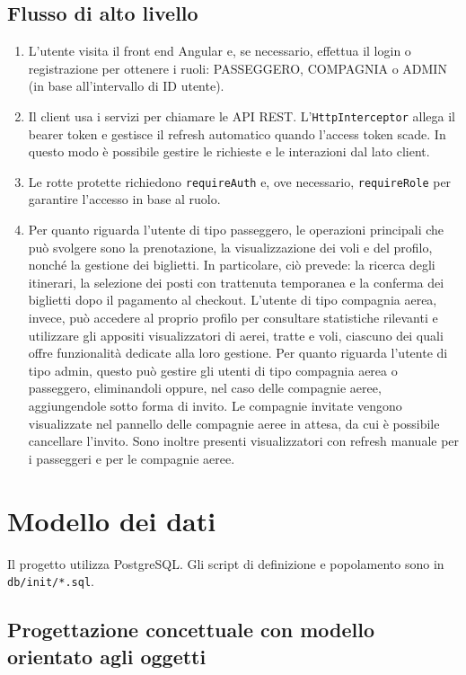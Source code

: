 \documentclass[12pt,a4paper]{article}
\begin{document}
\subsection{Flusso di alto livello}
\begin{enumerate}[noitemsep]
	\item L'utente visita il front end Angular e, se necessario, effettua il login o registrazione per ottenere i ruoli: PASSEGGERO, COMPAGNIA o ADMIN (in base all'intervallo di ID utente).
	\item Il client usa i servizi per chiamare le API REST. L'\texttt{HttpInterceptor} allega il bearer token e gestisce il refresh automatico quando l'access token scade. In questo modo è possibile gestire le richieste e le interazioni dal lato client.
	\item Le rotte protette richiedono \texttt{requireAuth} e, ove necessario, \texttt{requireRole} per garantire l'accesso in base al ruolo.
	\item Per quanto riguarda l'utente di tipo passeggero, le operazioni principali che può svolgere sono la prenotazione, la visualizzazione dei voli e del profilo, nonché la gestione dei biglietti. In particolare, ciò prevede: la ricerca degli itinerari, la selezione dei posti con trattenuta temporanea e la conferma dei biglietti dopo il pagamento al checkout. L'utente di tipo compagnia aerea, invece, può accedere al proprio profilo per consultare statistiche rilevanti e utilizzare gli appositi visualizzatori di aerei, tratte e voli, ciascuno dei quali offre funzionalità dedicate alla loro gestione. Per quanto riguarda l'utente di tipo admin, questo può gestire gli utenti di tipo compagnia aerea o passeggero, eliminandoli oppure, nel caso delle compagnie aeree, aggiungendole sotto forma di invito. Le compagnie invitate vengono visualizzate nel pannello delle compagnie aeree in attesa, da cui è possibile cancellare l'invito. Sono inoltre presenti visualizzatori con refresh manuale per i passeggeri e per le compagnie aeree.
\end{enumerate}

\newpage

\section{Modello dei dati}
Il progetto utilizza PostgreSQL. Gli script di definizione e popolamento sono in \texttt{db/init/*.sql}.

\subsection{Progettazione concettuale con modello orientato agli oggetti}
\label{sec:schema oo}
\end{document}
